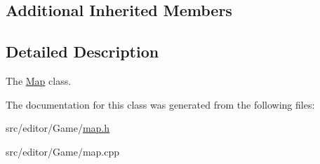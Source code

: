 \subsection*{Additional Inherited Members}


\subsection{Detailed Description}
The \hyperlink{class_map}{Map} class. 

The documentation for this class was generated from the following files\+:\begin{DoxyCompactItemize}
\item 
src/editor/\+Game/\hyperlink{map_8h}{map.\+h}\item 
src/editor/\+Game/map.\+cpp\end{DoxyCompactItemize}
